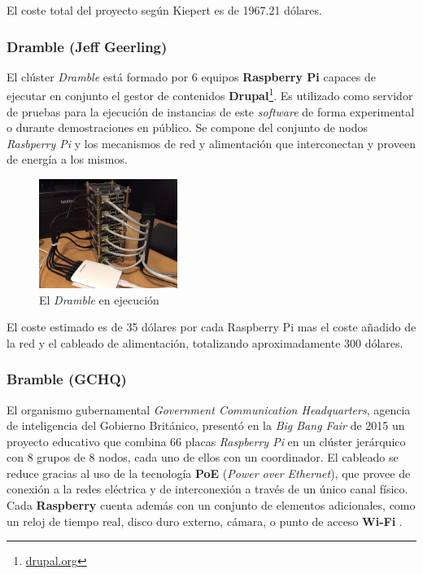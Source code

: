 El coste total del proyecto según Kiepert es de 1967.21 dólares.

\subsubsection{Dramble (Jeff Geerling)}
\label{geerling:dramble}

El clúster \textit{Dramble} está formado por 6 equipos \textbf{Raspberry Pi} capaces de ejecutar en conjunto el gestor de contenidos \textbf{Drupal}\footnote{\href{https://www.drupal.org/}{drupal.org}}. Es utilizado como servidor de pruebas para la ejecución de instancias de este \textit{software} de forma experimental o durante demostraciones en público\cite{geerlingraspberry}. Se compone del conjunto de nodos \textit{Rasbperry Pi} y los mecanismos de red y alimentación que interconectan y proveen de energía a los mismos.

\begin{figure}[H]
  \centering
  \includegraphics[width=0.4\textwidth]{Chapters/Chapter4/Figures/raspberry-pi-dramble-cluster-wired.jpg}
  \caption[Dramble]{El \textit{Dramble} en ejecución}

\end{figure}
El coste estimado es de 35 dólares por cada Raspberry Pi mas el coste añadido de la red y el cableado de alimentación, totalizando aproximadamente 300 dólares.

\subsubsection{Bramble (GCHQ)}

El organismo gubernamental \textit{Government Communication Headquarters}, agencia de inteligencia del Gobierno Británico, presentó en la \textit{Big Bang Fair} de 2015 un proyecto educativo que combina 66 placas \textit{Raspberry Pi} en un clúster jerárquico con 8 grupos de 8 nodos, cada uno de ellos con un coordinador. El cableado se reduce gracias al uso de la tecnología \textbf{PoE} (\textit{Power over Ethernet}), que provee de conexión a la redes eléctrica y de interconexión a través de un único canal físico. Cada \textbf{Raspberry} cuenta además con un conjunto de elementos adicionales, como un reloj de tiempo real, disco duro externo, cámara, o punto de acceso \textbf{Wi-Fi} \cite{gchqbramble}.

